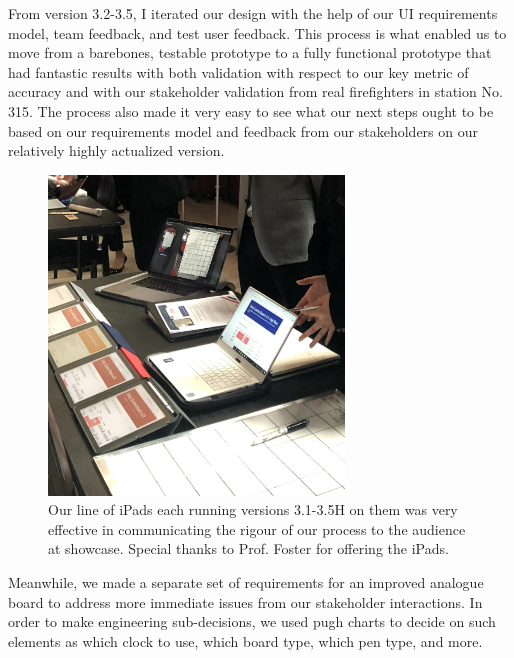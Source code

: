 \documentclass[a4paper,12pt]{article}
\begin{document}
From version 3.2-3.5, I iterated our design with the help of our UI requirements model, team feedback, and test user feedback. This process is what enabled us to move from a barebones, testable prototype to a fully functional prototype that had fantastic results with both validation with respect to our key metric of accuracy and with our stakeholder validation from real firefighters in station No. 315. The process also made it very easy to see what our next steps ought to be based on our requirements model and feedback from our stakeholders on our relatively highly actualized version.

\begin{figure}[H]
\centering
\includegraphics[width=0.7\textwidth]{img/image019.png}
\caption{Our line of iPads each running versions 3.1-3.5H on them was very effective in communicating the rigour of our process to the audience at showcase. Special thanks to Prof. Foster for offering the iPads.}
\label{}
\end{figure}

Meanwhile, we made a separate set of requirements for an improved analogue board to address more immediate issues from our stakeholder interactions. In order to make engineering sub-decisions, we used pugh charts to decide on such elements as which clock to use, which board type, which pen type, and more.
\end{document}
